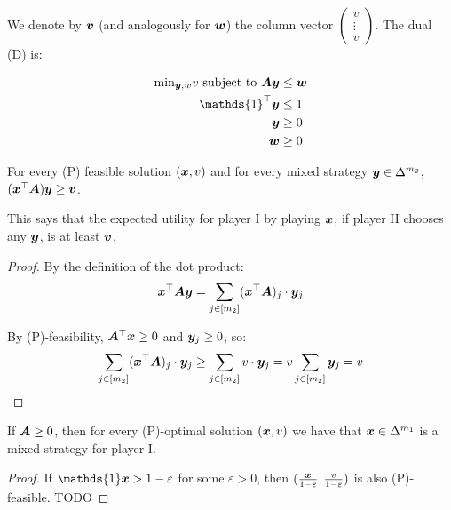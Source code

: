 We denote by $\bm{v}$ (and analogously for $\bm{w}$) the column vector
$\begin{pmatrix} v \\ \vdots \\ v \end{pmatrix}$. The dual (D) is:

\begin{equation}
	\begin{split}
		\text{min}_{\vect{y}, w} v \text{ subject to }
		\vect{A} \vect{y} & \le \vect{w} \\
		\mathds{1}^\top \vect{y} & \le 1 \\
		\vect{y} & \ge 0 \\
		\vect{w} & \ge 0
	\end{split}
\end{equation}

\begin{fact}
	\label{fact:A}
	For every (P) feasible solution $(\bm{x}, v)$ and for every
	mixed strategy $\bm{y} \in \Delta^{m_2}$, $(\bm{x}^\top
	\bm{A})\bm{y} \ge \bm{v}$.
\end{fact}

This says that the expected utility for player I by playing $\bm{x}$, if
player II chooses any $\bm{y}$, is at least $\bm{v}$.

\begin{proof}
	By the definition of the dot product:
	\begin{equation*}
		\bm{x}^\top \bm{A} \bm{y} = \sum_{j \in [m_2]}
		(\bm{x}^\top \bm{A})_j \cdot \bm{y}_j
	\end{equation*}

	By (P)-feasibility, $\bm{A}^\top \bm{x} \ge 0$ and
	$\bm{y}_j \ge 0$, so:
	\begin{equation*}
		\sum_{j \in [m_2]} (\bm{x}^\top \bm{A})_j \cdot
		\bm{y}_j \ge \sum_{j \in [m_2]} v \cdot \bm{y}_j = v
		\sum_{j \in [m_2]} \bm{y}_j = v
	\end{equation*}
\end{proof}

\begin{fact}
	\label{fact:B}
	If $\bm{A} \ge 0$, then for every (P)-optimal solution $(\bm{x}, v)$ we
	have that $\bm{x} \in \Delta^{m_1}$ is a mixed strategy for player I.
\end{fact}

\begin{proof}
	If $\mathds{1} \vect{x} > 1 - \varepsilon$ for some $\varepsilon > 0$, then
	$(\frac{\bm{x}}{1-\varepsilon}, \frac{v}{1-\varepsilon})$ is also
	(P)-feasible. TODO
\end{proof}

